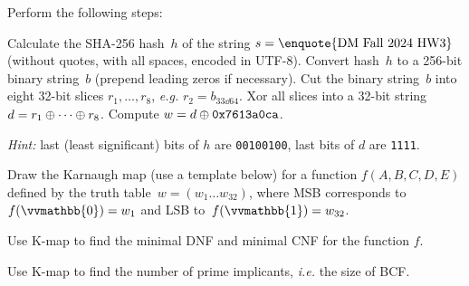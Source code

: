 \documentclass[a4paper,12pt]{article}
\begin{document}

\begin{tasks}
    \item Perform the following steps:
    \begin{subtasks}
        \item Calculate the SHA-256 hash~$h$ of the string $s = \text{\enquote{DM Fall 2024 HW3}}$ (without quotes, with all spaces, encoded in UTF-8).
        Convert hash~$h$ to a 256-bit binary string~$b$ (prepend leading zeros if necessary).
        Cut the binary string~$b$ into eight 32-bit slices $r_1, \dotsc, r_8$, \textit{e.g.} $r_2 = b_{33 \dd 64}$.
        Xor all slices into a 32-bit string $d = r_1 \oplus \dotsb \oplus r_8$.
        Compute $w = d \oplus \mathtt{0x7613a0ca}$.

        \textit{Hint:} last (least significant) bits of $h$ are \textellipsis\texttt{00100100}, last bits of $d$ are \textellipsis\texttt{1111}.

        \item Draw the Karnaugh map (use a template below) for a function $f(A,B,C,D,E)$ defined by the truth table~$w = (w_{1} \dots w_{32})$, where MSB corresponds to~$f(\vvmathbb{0}) = w_{1}$ and LSB to~$f(\vvmathbb{1}) = w_{32}$.

        \item Use K-map to find the minimal DNF and minimal CNF for the function $f$.

        \item Use K-map to find the number of prime implicants, \textit{i.e.} the size of BCF\@.

\end{subtasks}
\end{tasks}
\end{document}
